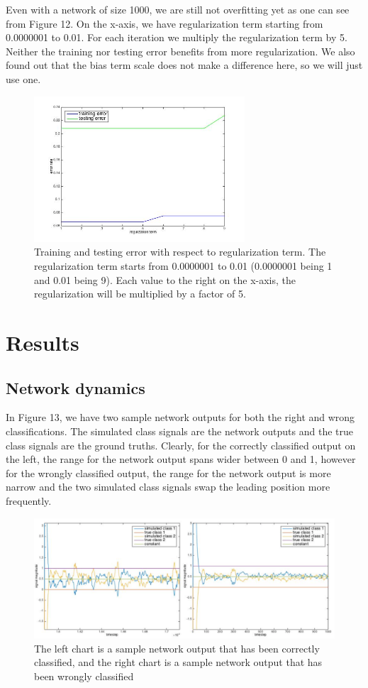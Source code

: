 \documentclass[a4paper,11pt,oneside]{article}
\begin{document}
Even with a network of size 1000, we are still not overfitting yet as one can see from Figure 12. On the x-axis, we have regularization term starting from 0.0000001 to 0.01. For each iteration we multiply the regularization term by 5. Neither the training nor testing error benefits from more regularization. We also found out that the bias term scale does not make a difference here, so we will just use one.
\begin{figure}[h!]
	\centering
	\includegraphics[width=0.7\textwidth]{img/reg}
	\caption{Training and testing error with respect to regularization term. The regularization term starts from 0.0000001 to 0.01 (0.0000001 being 1 and 0.01 being 9). Each value to the right on the x-axis, the regularization will be multiplied by a factor of 5.}
\end{figure}

\section{Results}
\subsection{Network dynamics}
In Figure 13, we have two sample network outputs for both the right and wrong classifications. The simulated class signals are the network outputs and the true class signals are the ground truths. Clearly, for the correctly classified output on the left, the range for the network output spans wider between 0 and 1, however for the wrongly classified output, the range for the network output is more narrow and the two simulated class signals swap the leading position more frequently.

\begin{figure}[h!]
	\centering
	\includegraphics[width=1.05\textwidth]{img/simulation}
	\caption{The left chart is a sample network output that has been correctly classified, and the right chart is a sample network output that has been wrongly classified}
\end{figure}
\end{document}
